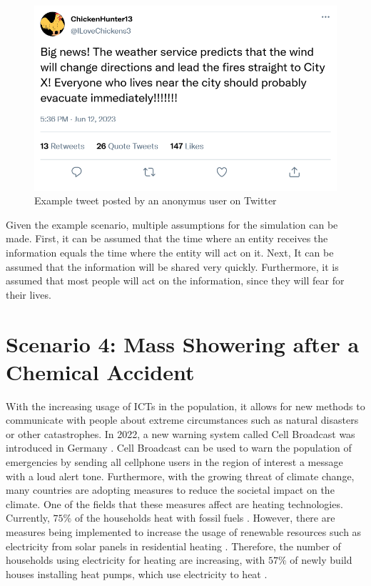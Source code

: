\begin{figure}[!ht]
    \center
    \includegraphics[scale=.4]{figs/firenews.png}
    \caption{Example tweet posted by an anonymus user on Twitter}
    \label{firetweet}
\end{figure}

Given the example scenario, multiple assumptions for the simulation can
be made. First, it can be assumed that the time where an entity receives
the information equals the time where the entity will act on it.
Next, It can be assumed that the information will be shared very quickly.
Furthermore, it is assumed that most people will act on the information,
since they will fear for their lives.


\section{Scenario 4: Mass Showering after a Chemical Accident}

With the increasing usage of ICTs in the population, it allows for 
new methods to communicate with people about extreme circumstances
such as natural disasters or other catastrophes. In 2022,
a new warning system called Cell Broadcast was introduced in Germany
\cite{techrichtlinie}. Cell Broadcast can be used to warn the population
of emergencies by sending all cellphone users in the 
region of interest a message with a loud alert tone.
Furthermore, with the growing threat of climate change, many countries
are adopting measures to reduce the societal impact on the
climate. One of the fields that these measures affect 
are heating technologies. Currently, $75\%$ of the households 
heat with fossil fuels \cite{bdewhouhseholds}. 
However, there are measures being 
implemented to increase the usage of renewable resources such 
as electricity from solar panels in residential heating
\cite{heizungsgesetz}. Therefore, the number of households 
using electricity for heating are increasing, with 
$57\%$ of newly build houses installing 
heat pumps, which use electricity to heat
\cite{heatingpumps}.

